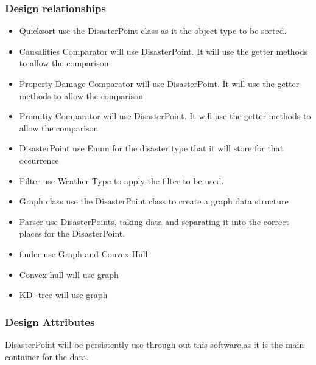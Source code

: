 \documentclass[12pt]{article}
\begin{document}
            \subsubsection{Design relationships}
                \begin{itemize}
                    \item Quicksort use the DisasterPoint class as it the object type to be sorted.
                    \item Causalities Comparator will use DisasterPoint. It will use the getter methods to allow the comparison 
                    \item Property Damage Comparator will use DisasterPoint. It will use the getter methods to allow the comparison
                    \item Promitiy Comparator will use DisasterPoint. It will use the getter methods to allow the comparison 
                    \item DisasterPoint use Enum for the disaster type that it will store for that occurrence 
                    \item Filter use Weather Type to apply the filter to be used.
                    \item Graph class use the DisasterPoint class to create a graph data structure 
                    \item Parser use DisasterPoints, taking data and separating it into the correct places for the DisasterPoint.
                    \item finder use Graph and Convex Hull
                    
                    \item Convex hull will use graph 
                    \item KD -tree will use graph 
                \end{itemize}
                
            \subsubsection{Design Attributes}
                DisasterPoint will be persistently use through out this software,as it is the main container for the data.
                
\end{document}
